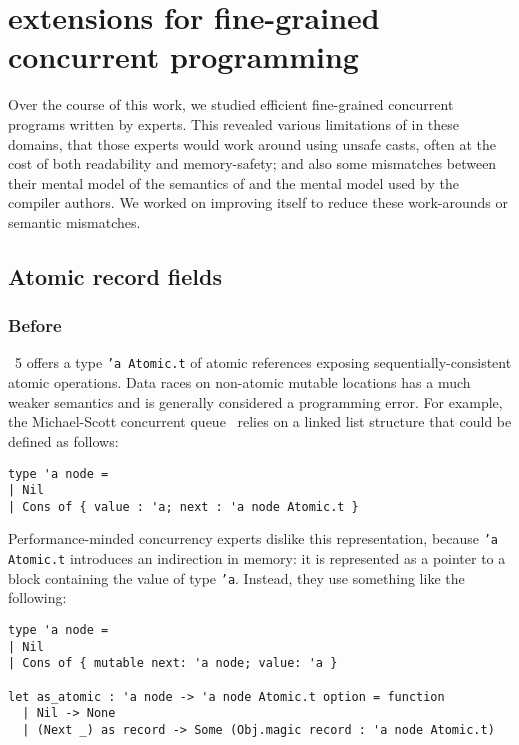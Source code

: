 \section{\OCaml extensions for fine-grained concurrent programming}
\label{sec:ocaml}

Over the course of this work, we studied efficient fine-grained concurrent \OCaml programs written by experts.
This revealed various limitations of \OCaml in these domains, that those experts would work around using unsafe casts, often at the cost of both readability and memory-safety; and also some mismatches between their mental model of the semantics of \OCaml and the mental model used by the \OCaml compiler authors.
We worked on improving \OCaml itself to reduce these work-arounds or semantic mismatches.

\subsection{Atomic record fields}

\subsubsection{Before}

\OCaml~5 offers a type \texttt{'a Atomic.t} of atomic references exposing sequentially-consistent atomic operations.
Data races on non-atomic mutable locations has a much weaker semantics and is generally considered a programming error.
For example, the Michael-Scott concurrent queue~\cite{DBLP:conf/podc/MichaelS96} relies on a linked list structure that could be defined as follows:

\begin{verbatim}
type 'a node =
| Nil
| Cons of { value : 'a; next : 'a node Atomic.t }
\end{verbatim}

Performance-minded concurrency experts dislike this representation, because \texttt{'a Atomic.t} introduces an indirection in memory: it is represented as a pointer to a block containing the value of type \texttt{'a}.
Instead, they use something like the following:

\begin{verbatim}
type 'a node =
| Nil
| Cons of { mutable next: 'a node; value: 'a }

let as_atomic : 'a node -> 'a node Atomic.t option = function
  | Nil -> None
  | (Next _) as record -> Some (Obj.magic record : 'a node Atomic.t)
\end{verbatim}

